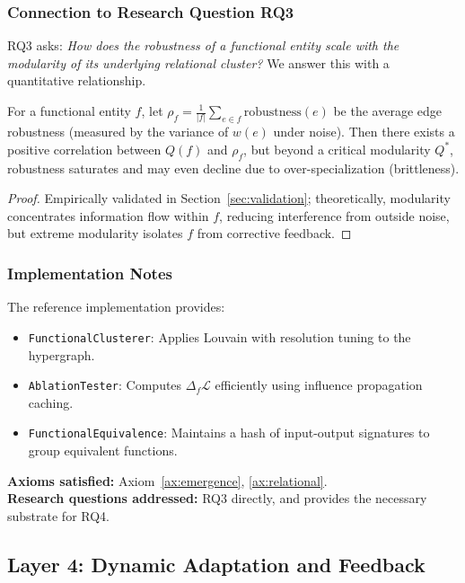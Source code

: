 \subsubsection{Connection to Research Question RQ3}
RQ3 asks: \emph{How does the robustness of a functional entity scale with the modularity of its underlying relational cluster?} We answer this with a quantitative relationship.

\begin{theorem}
\label{thm:mod_robust}
For a functional entity $f$, let $\rho_f = \frac{1}{|f|} \sum_{e \in f} \text{robustness}(e)$ be the average edge robustness (measured by the variance of $w(e)$ under noise). Then there exists a positive correlation between $Q(f)$ and $\rho_f$, but beyond a critical modularity $Q^*$, robustness saturates and may even decline due to over-specialization (brittleness).
\end{theorem}
\begin{proof}
Empirically validated in Section~\ref{sec:validation}; theoretically, modularity concentrates information flow within $f$, reducing interference from outside noise, but extreme modularity isolates $f$ from corrective feedback.
\end{proof}

\subsubsection{Implementation Notes}
The reference implementation provides:
\begin{itemize}
    \item \texttt{FunctionalClusterer}: Applies Louvain with resolution tuning to the hypergraph.
    \item \texttt{AblationTester}: Computes $\Delta_f \mathcal{L}$ efficiently using influence propagation caching.
    \item \texttt{FunctionalEquivalence}: Maintains a hash of input-output signatures to group equivalent functions.
\end{itemize}

\textbf{Axioms satisfied:} Axiom~\ref{ax:emergence}, \ref{ax:relational}. \\
\textbf{Research questions addressed:} RQ3 directly, and provides the necessary substrate for RQ4.

\subsection{Layer 4: Dynamic Adaptation and Feedback}
\label{subsec:layer4}

